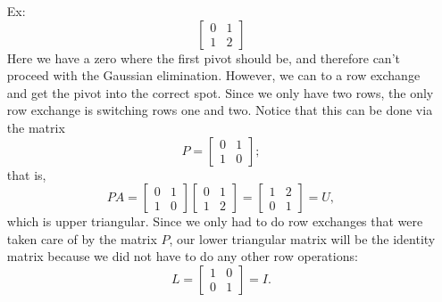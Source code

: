 \documentclass[reqno]{amsart}
\theoremstyle{definition}
\begin{document}
\begin{itemize}

\item[Ex:  ]  
%
\begin{equation*}
\begin{bmatrix}
0 & 1\\
1 & 2
\end{bmatrix}
\end{equation*}
%
Here we have a zero where the first pivot should be, and therefore can't proceed with the Gaussian elimination.  However, we can to a row exchange and get the pivot into the correct spot.  Since we only have two rows, the only row exchange is switching rows one and two.  Notice that this can be done via the matrix
%
\begin{equation*}
P = \begin{bmatrix}
0 & 1\\
1 & 0
\end{bmatrix};
\end{equation*}
%
that is,
%
\begin{equation*}
PA = \begin{bmatrix}
0 & 1\\
1 & 0
\end{bmatrix}\begin{bmatrix}
0 & 1\\
1 & 2
\end{bmatrix} = \begin{bmatrix}
1 & 2\\
0 & 1
\end{bmatrix} = U,
\end{equation*}
%
which is upper triangular.  Since we only had to do row exchanges that were taken care of by the matrix $P$, our lower triangular matrix will be the identity matrix because we did not have to do any other row operations:
%
\begin{equation*}
L = \begin{bmatrix}
1 & 0\\
0 & 1
\end{bmatrix} = I.
\end{equation*}


\end{itemize}
\end{document}
